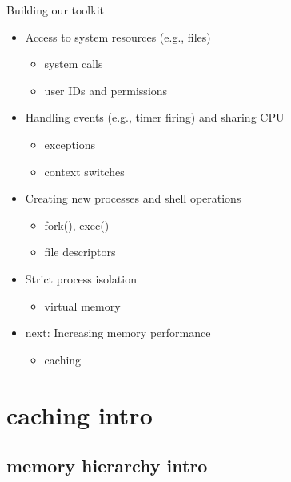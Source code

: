 \begin{frame}{Building our toolkit}
    \begin{itemize}
        \item Access to system resources (e.g., files)
            \begin{itemize}
            \item system calls
            \item user IDs and permissions
            \end{itemize}

        \item Handling events (e.g., timer firing) and sharing CPU
            \begin{itemize}
                \item exceptions
                \item context switches
            \end{itemize}

        \item Creating new processes and shell operations
            \begin{itemize}
                \item fork(), exec()
                \item file descriptors
            \end{itemize}

        \item Strict process isolation
            \begin{itemize}
                \item virtual memory
            \end{itemize}

        \item next: Increasing memory performance
            \begin{itemize}
                \item caching
            \end{itemize}

    \end{itemize}
\end{frame}




\section{caching intro}

\subsection{memory hierarchy intro}


